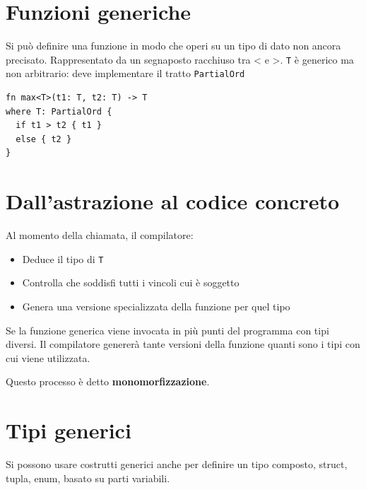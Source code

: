 \section{Funzioni generiche}

\begin{center}
  \begin{minipage}{0.65\linewidth}
    Si può definire una funzione in modo che operi su un tipo di dato non ancora
    precisato.
    Rappresentato da un segnaposto racchiuso tra < e >. \verb|T| è generico ma non
    arbitrario: deve implementare il tratto \verb|PartialOrd|

  \end{minipage}%
  \hfill
  \begin{minipage}{0.3\linewidth}
    \begin{verbatim}
fn max<T>(t1: T, t2: T) -> T
where T: PartialOrd {
  if t1 > t2 { t1 }
  else { t2 }
}
\end{verbatim}
  \end{minipage}
\end{center}

\section{Dall'astrazione al codice concreto}

Al momento della chiamata, il compilatore:

\begin{itemize}
  \item Deduce il tipo di \verb|T|
  \item Controlla che soddisfi tutti i vincoli cui è soggetto
  \item Genera una versione specializzata della funzione per quel tipo
\end{itemize}

Se la funzione generica viene invocata in più punti del programma con tipi
diversi. Il compilatore genererà tante versioni della funzione quanti sono i
tipi con cui viene utilizzata.

Questo processo è detto \textbf{monomorfizzazione}.

\section{Tipi generici}

Si possono usare costrutti generici anche per definire un tipo composto, struct,
tupla, enum, basato su parti variabili.

